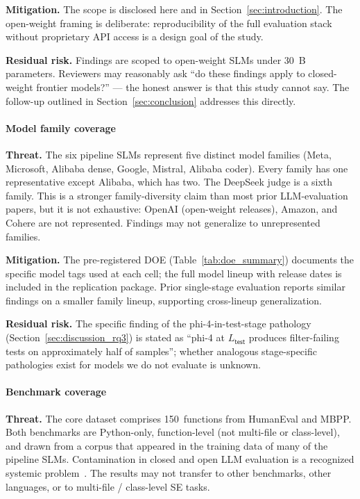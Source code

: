 \textbf{Mitigation.} The scope is disclosed here and in Section~\ref{sec:introduction}. The open-weight framing is deliberate: reproducibility of the full evaluation stack without proprietary API access is a design goal of the study.

\textbf{Residual risk.} Findings are scoped to open-weight SLMs under 30~B parameters. Reviewers may reasonably ask ``do these findings apply to closed-weight frontier models?'' --- the honest answer is that this study cannot say. The follow-up outlined in Section~\ref{sec:conclusion} addresses this directly.

\paragraph{Model family coverage}

\textbf{Threat.} The six pipeline SLMs represent five distinct model families (Meta, Microsoft, Alibaba dense, Google, Mistral, Alibaba coder). Every family has one representative except Alibaba, which has two. The DeepSeek judge is a sixth family. This is a stronger family-diversity claim than most prior LLM-evaluation papers, but it is not exhaustive: OpenAI (open-weight releases), Amazon, and Cohere are not represented. Findings may not generalize to unrepresented families.

\textbf{Mitigation.} The pre-registered DOE (Table~\ref{tab:doe_summary}) documents the specific model tags used at each cell; the full model lineup with release dates is included in the replication package. Prior single-stage evaluation reports similar findings on a smaller family lineup, supporting cross-lineup generalization.

\textbf{Residual risk.} The specific finding of the phi-4-in-test-stage pathology (Section~\ref{sec:discussion_rq3}) is stated as ``phi-4 at $L_{\textsf{test}}$ produces filter-failing tests on approximately half of samples''; whether analogous stage-specific pathologies exist for models we do not evaluate is unknown.

\paragraph{Benchmark coverage}

\textbf{Threat.} The core dataset comprises 150~functions from HumanEval and MBPP. Both benchmarks are Python-only, function-level (not multi-file or class-level), and drawn from a corpus that appeared in the training data of many of the pipeline SLMs. Contamination in closed and open LLM evaluation is a recognized systemic problem~\citep{Balloccu2025LLMDataContamination}. The results may not transfer to other benchmarks, other languages, or to multi-file / class-level SE tasks.

